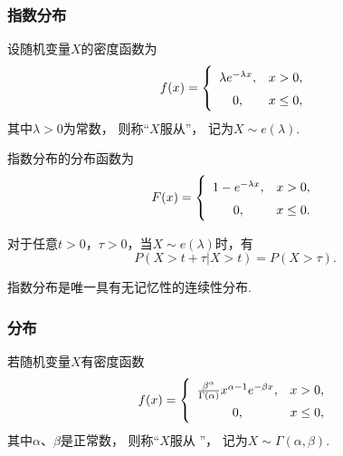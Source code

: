 \subsubsection{指数分布}
\begin{definition}
设随机变量\(X\)的密度函数为\begin{equation}
f(x) = \left\{ \def\arraystretch{1.5}
\begin{array}{cl}
\lambda e^{-\lambda x}, & x > 0, \\
0, & x \leq 0, \\
\end{array} \right.
\end{equation}其中\(\lambda > 0\)为常数，
则称“\(X\)服从”，
记为\(X \sim e(\lambda)\).
\end{definition}

\begin{theorem}
指数分布的分布函数为\begin{equation}
	F(x) = \left\{ \def\arraystretch{1.5}
	\begin{array}{cl}
		1 - e^{-\lambda x}, & x > 0, \\
		0, & x \leq 0. \\
	\end{array} \right.
\end{equation}
\end{theorem}

\begin{theorem}[指数分布的无记忆性]
对于任意\(t > 0\)，\(\tau > 0\)，当\(X \sim e(\lambda)\)时，有\[
P(X > t + \tau \vert X > t) = P(X > \tau).
\]

指数分布是唯一具有无记忆性的连续性分布.
\end{theorem}

\subsubsection{\textGamma 分布}
\begin{definition}
若随机变量\(X\)有密度函数\begin{equation}
	f(x) = \left\{
	\def\arraystretch{1.5}
	\begin{array}{cl}
		\frac{\beta^\alpha}{\Gamma(\alpha)} x^{\alpha-1} e^{-\beta x}, & x > 0, \\
		0, & x \leq 0, \\
	\end{array} \right.
\end{equation}
其中\(\alpha\)、\(\beta\)是正常数，
则称“\(X\)服从 ”，
记为\(X \sim \Gamma(\alpha,\beta)\).
\end{definition}

